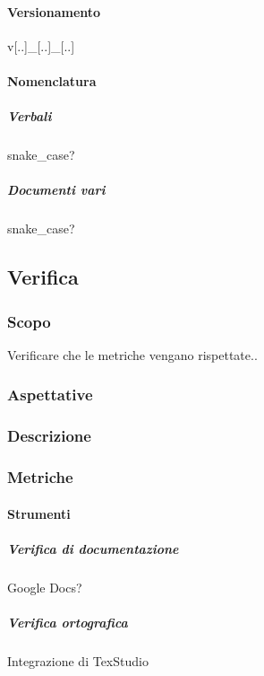 			\paragraph{Versionamento}
			v[..]\_[..]\_[..]	%

			\paragraph{Nomenclatura}

			\subparagraph{Verbali}
			snake\_case?

			\subparagraph{Documenti vari}
			snake\_case?

	\subsection{Verifica}

		\subsubsection{Scopo}
		Verificare che le metriche vengano rispettate..

		\subsubsection{Aspettative}

		\subsubsection{Descrizione}

		\subsubsection{Metriche}




			\paragraph{Strumenti}

			\subparagraph{Verifica di documentazione}
			Google Docs?

			\subparagraph{Verifica ortografica}
			Integrazione di TexStudio


